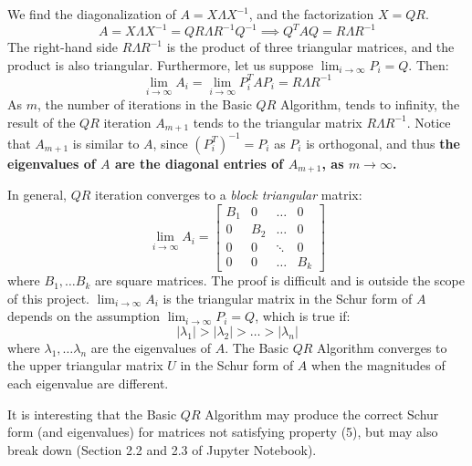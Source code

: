 \documentclass{article}
\begin{document}
We find the diagonalization of $A=X\Lambda X^{-1}$, and the factorization $X=QR$.
\begin{equation*}
	A=X\Lambda X^{-1}
	=QR\Lambda R^{-1}Q^{-1}
	\implies Q^T AQ=R\Lambda R^{-1}
\end{equation*}
The right-hand side $R\Lambda R^{-1}$ is the product of three triangular matrices, and the product is also triangular. Furthermore, let us suppose $\lim_{i\to\infty}P_i=Q$. Then:
\begin{equation*}
	\lim_{i\to\infty}A_i=\lim_{i\to\infty}P_i^T A P_i=R\Lambda R^{-1}
\end{equation*}
As $m$, the number of iterations in the Basic $QR$ Algorithm, tends to infinity, the result of the $QR$ iteration $A_{m+1}$ tends to the triangular matrix $R\Lambda R^{-1}$. Notice that $A_{m+1}$ is similar to $A$, since $\left(P_i^T\right)^{-1}=P_i$ as $P_i$ is orthogonal, and thus \textbf{the eigenvalues of $A$ are the diagonal entries of $A_{m+1}$, as $m\to\infty$.}

In general, $QR$ iteration converges to a \textit{block triangular} matrix:
\begin{equation*}
    \lim_{i\to\infty}A_i
	=\begin{bmatrix}
		B_1 & 0 & \ldots & 0 \\
		0 & B_2 & \ldots & 0 \\
		0 & 0 & \ddots & 0 \\
		0 & 0 & \ldots & B_k
	\end{bmatrix}
\end{equation*}
where $B_1,\ldots B_k$ are square matrices. The proof is difficult and is outside the scope of this project. $\lim_{i\to\infty}A_i$ is the triangular matrix in the Schur form of $A$ depends on the assumption $\lim_{i\to\infty}P_i=Q$, which is true if:
\begin{equation}
	\left|\lambda_1\right|>\left|\lambda_2\right|>\ldots>\left|\lambda_n\right|   
\end{equation}
where $\lambda_1,\ldots\lambda_n$ are the eigenvalues of $A$. The Basic $QR$ Algorithm converges to the upper triangular matrix $U$ in the Schur form of $A$ when the magnitudes of each eigenvalue are different.

It is interesting that the Basic $QR$ Algorithm may produce the correct Schur form (and eigenvalues) for matrices not satisfying property (5), but may also break down (Section 2.2 and 2.3 of Jupyter Notebook).
\end{document}
